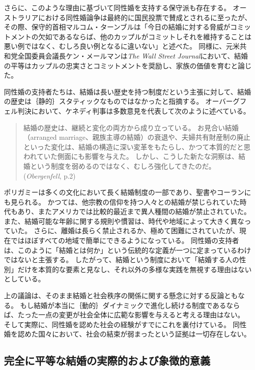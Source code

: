 \documentclass[paper=a4,book,openany]{jlreq}
\begin{document}
さらに、このような理由に基づいて同性婚を支持する保守派も存在する。
オーストラリアにおける同性婚論争は最終的に国民投票で賛成とされるに至ったが、その際、保守的首相マルコム・ターンブルは「今日の結婚に対する脅威がコミットメントの欠如であるならば、他のカップルがコミットしそれを維持することは悪い例ではなく、むしろ良い例となるに違いない」と述べた\citep{gartrell17:_malcol_turnb_makes_conser_case}。
同様に、元米共和党全国委員会議長ケン・メールマンは\emph{The Wall Street Journal}において、結婚の平等はカップルの忠実さとコミットメントを奨励し、家族の価値を育むと論じた\citep{mehlman12:_makin_same_sex_case}。

同性婚の支持者たちは、結婚は長い歴史を持つ制度だという主張に対して、結婚の歴史は｛静的｝{スタティック}なものではなかったと指摘する。
オーバーグフェル判決において、ケネディ判事は多数意見を代表して次のように述べている。

\begin{quote}
結婚の歴史は、継続と変化の両方から成り立っている。
お見合い結婚（arranged marriage、親族主導の結婚）の衰退や、夫婦共有財産制の廃止といった変化は、結婚の構造に深い変革をもたらし、かつて本質的だと思われていた側面にも影響を与えた。
しかし、こうした新たな洞察は、結婚という制度を弱めるのではなく、むしろ強化してきたのだ。
(\emph{Obergenfell}, p.2)
\end{quote}

ポリガミーは多くの文化において長く結婚制度の一部であり、聖書やコーランにも見られる。
かつては、他宗教の信仰を持つ人々との結婚が禁じられていた時代もあり、またアメリカでは比較的最近まで異人種間の結婚が禁止されていた。
また、結婚可能な年齢に関する規則や慣習は、時代や地域によって大きく異なっていた。
さらに、離婚は長らく禁止されるか、極めて困難にされていたが、現在ではほぼすべての地域で簡単にできるようになっている。
同性婚の支持者は、このように「結婚とは何か」という伝統的な定義が一つに定まっているわけではないと主張する。
したがって、結婚という制度において「結婚する人の性別」だけを本質的な要素と見なし、それ以外の多様な実践を無視する理由はないとしている。

上の議論は、そのまま結婚と社会秩序の関係に関する懸念に対する反論ともなる。
もし結婚が本当に｛動的｝{ダイナミック}で進化し続ける制度であるならば、たった一点の変更が社会全体に広範な影響を与えると考える理由はない。
そして実際に、同性婚を認めた社会の経験がすでにこれを裏付けている。
同性婚を認めた国々において、社会の結束が弱まったという証拠は一切存在しない。

\subsection{完全に平等な結婚の実際的および象徴的意義}
\end{document}
